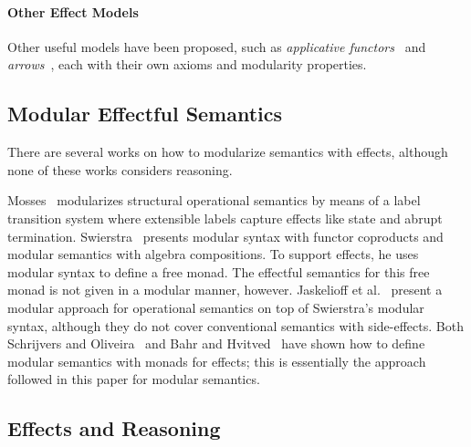 
\paragraph{Other Effect Models} Other useful models have been
proposed, such as \emph{applicative
functors}~\citep{mcbride08applicative} and
\emph{arrows}~\citep{hughes98generalisingmonads}, each with their own
axioms and modularity properties.

\subsection{Modular Effectful Semantics}

There are several works on how to modularize semantics with effects,
although none of these works considers reasoning.

Mosses~\cite{msos} modularizes structural operational semantics by means of a
label transition system where extensible labels capture effects like state and
abrupt termination.
Swierstra~\cite{swierstra08dtc} presents modular syntax with functor coproducts
and modular semantics with algebra compositions. To support effects, he uses
modular syntax to define a free monad. The effectful semantics for
this free monad is not given in a modular manner, however.
Jaskelioff et al.~\cite{jaskelioff11modularity} present a modular approach for operational
semantics on top of Swierstra's modular syntax, although they do not cover 
conventional semantics with side-effects. %
Both Schrijvers and Oliveira~\cite{schrijvers10zipper+tr} and %
Bahr and Hvitved~\cite{bahr11compositional}
have shown how to define modular semantics with monads for effects;
this is essentially the approach followed in this paper for modular semantics.

\subsection{Effects and Reasoning}

